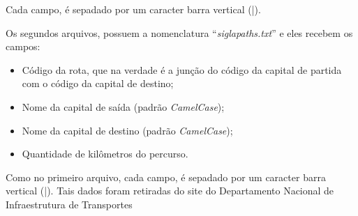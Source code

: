 Cada campo, é sepadado por um caracter barra vertical (|). 

Os segundos arquivos, possuem a nomenclatura ``\textit{sigla\underline{\hspace{.1in}}paths.txt}'' e eles recebem os campos:

\begin{itemize}
	\item Código da rota, que na verdade é a junção do código da capital de partida com o código da capital de destino;
	\item Nome da capital de saída (padrão \textit{CamelCase});
	\item Nome da capital de destino (padrão \textit{CamelCase});
	\item Quantidade de kilômetros do percurso.
\end{itemize}

Como no primeiro arquivo, cada campo, é sepadado por um caracter barra vertical (|). Tais dados foram retiradas do site do Departamento Nacional de Infraestrutura de Transportes \cite{DNIT}
